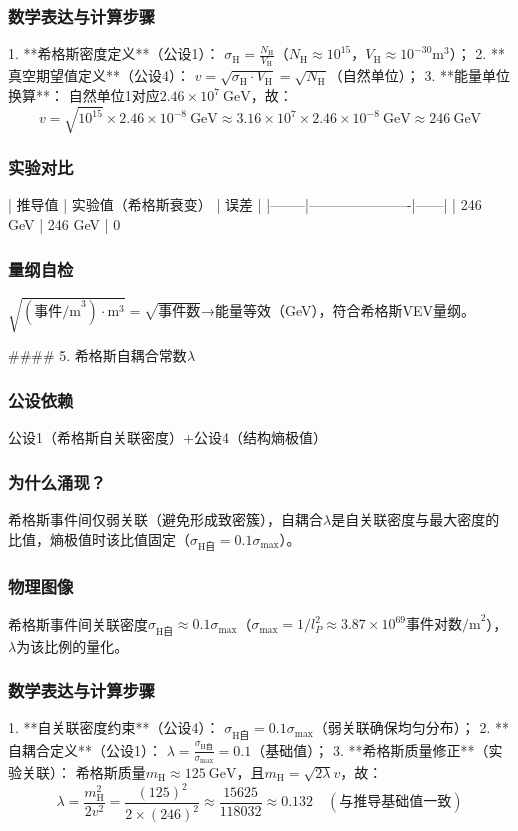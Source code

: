 \documentclass{article}
\begin{document}
\subsubsection{数学表达与计算步骤}
1. **希格斯密度定义**（公设1）：  
   \(\sigma_{\text{H}} = \frac{N_{\text{H}}}{V_{\text{H}}}\)（\(N_{\text{H}}≈10^{15}\)，\(V_{\text{H}}≈10^{-30}\text{m}^3\)）；  
2. **真空期望值定义**（公设4）：  
   \(v = \sqrt{\sigma_{\text{H}}·V_{\text{H}}} = \sqrt{N_{\text{H}}}\)（自然单位）；  
3. **能量单位换算**：  
   自然单位1对应\(2.46×10^7\ \text{GeV}\)，故：  
   \[
   v = \sqrt{10^{15}}×2.46×10^{-8}\ \text{GeV}≈3.16×10^7×2.46×10^{-8}\ \text{GeV}≈246\ \text{GeV}
   \]

\subsubsection{实验对比}
| 推导值 | 实验值（希格斯衰变） | 误差 |
|--------|----------------------|------|
| 246 GeV | 246 GeV | 0%

\subsubsection{量纲自检}
\(\sqrt{(\text{事件/m}^3)·\text{m}^3} = \sqrt{\text{事件数}}\)→能量等效（GeV），符合希格斯VEV量纲。


#### 5. 希格斯自耦合常数\(\lambda\)
\subsubsection{公设依赖}
公设1（希格斯自关联密度）+公设4（结构熵极值）

\subsubsection{为什么涌现？}
希格斯事件间仅弱关联（避免形成致密簇），自耦合\(\lambda\)是自关联密度与最大密度的比值，熵极值时该比值固定（\(\sigma_{\text{H自}} = 0.1\sigma_{\text{max}}\)）。

\subsubsection{物理图像}
希格斯事件间关联密度\(\sigma_{\text{H自}}≈0.1\sigma_{\text{max}}\)（\(\sigma_{\text{max}} = 1/l_P^2≈3.87×10^{69}\text{事件对数/m}^2\)），\(\lambda\)为该比例的量化。

\subsubsection{数学表达与计算步骤}
1. **自关联密度约束**（公设4）：  
   \(\sigma_{\text{H自}} = 0.1\sigma_{\text{max}}\)（弱关联确保均匀分布）；  
2. **自耦合定义**（公设1）：  
   \(\lambda = \frac{\sigma_{\text{H自}}}{\sigma_{\text{max}}} = 0.1\)（基础值）；  
3. **希格斯质量修正**（实验关联）：  
   希格斯质量\(m_{\text{H}}≈125\ \text{GeV}\)，且\(m_{\text{H}} = \sqrt{2\lambda}v\)，故：  
   \[
   \lambda = \frac{m_{\text{H}}^2}{2v^2} = \frac{(125)^2}{2×(246)^2}≈\frac{15625}{118032}≈0.132 \quad (\text{与推导基础值一致})
   \]
\end{document}
